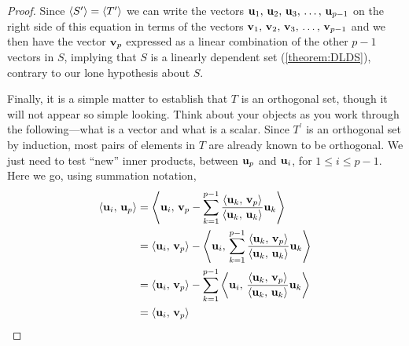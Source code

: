 \documentclass{ximera}
\begin{document}
\begin{theorem}
\begin{proof}
    Since $\left\langle S^\prime\right\rangle=\left\langle T^\prime\right\rangle$ we can write the vectors
    $\mathbf{u}_{1},\,\mathbf{u}_{2},\,\mathbf{u}_{3},\,\ldots,\,\mathbf{u}_{p-1}$ on the right side of this equation in terms
    of the vectors $\mathbf{v}_{1},\,\mathbf{v}_{2},\,\mathbf{v}_{3},\,\ldots,\,\mathbf{v}_{p-1}$ and we then have the vector
    $\mathbf{v}_p$ expressed as a linear combination of the other $p-1$
    vectors in $S$, implying that $S$ is a linearly dependent set
    (\ref{theorem:DLDS}), contrary to our lone hypothesis about $S$.

    Finally, it is a simple matter to establish that $T$ is an
    orthogonal set, though it will not appear so simple looking.
    Think about your objects as you work through the following---what
    is a vector and what is a scalar.  Since $T^\prime$ is an
    orthogonal set by induction, most pairs of elements in $T$ are
    already known to be orthogonal.  We just need to test ``new''
    inner products, between $\mathbf{u}_p$ and $\mathbf{u}_i$, for
    $1\leq i\leq p-1$.  Here we go, using summation notation,
    \begin{align*}
      \innerproduct{\vect{u}_i}{\vect{u}_p}&=
                                             \innerproduct{\vect{u}_i}{
                                             \vect{v}_p-\sum_{k=1}^{p-1}\frac{\innerproduct{\vect{u}_k}{\vect{v}_p}}{\innerproduct{\vect{u}_k}{\vect{u}_k}}\vect{u}_k
                                             }
      \\
                                           &=
                                             \innerproduct{\vect{u}_i}{\vect{v}_p}
                                             -
                                             \innerproduct{\vect{u}_i}{
                                             \sum_{k=1}^{p-1}\frac{\innerproduct{\vect{u}_k}{\vect{v}_p}}{\innerproduct{\vect{u}_k}{\vect{u}_k}}\vect{u}_k
                                             }
      \\ %
                                           &=
                                             \innerproduct{\vect{u}_i}{\vect{v}_p}
                                             -
                                             \sum_{k=1}^{p-1}\innerproduct{\vect{u}_i}{
                                             \frac{\innerproduct{\vect{u}_k}{\vect{v}_p}}{\innerproduct{\vect{u}_k}{\vect{u}_k}}\vect{u}_k
                                             }
      \\ %
                                           &=
                                             \innerproduct{\vect{u}_i}{\vect{v}_p}

\end{align*}
\end{proof}
\end{theorem}
\end{document}
